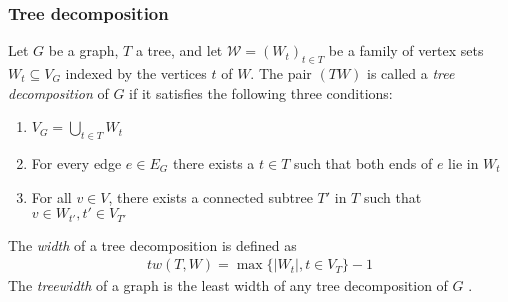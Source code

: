 \subsubsection{Tree decomposition}
Let $G$ be a graph, $T$ a tree, and let $\mathcal{W} = \left(W_t\right)_{t\in T}$ be a family of vertex sets $W_t \subseteq V_G$ indexed by the vertices $t$ of $W$. The pair $(TW)$ is called a \emph{tree decomposition} of $G$ if it satisfies the following three conditions:
\begin{enumerate}
	\item $V_G = \bigcup_{t\in T}W_t$
	\item For every edge $e\in E_G$ there exists a $t\in T$ such that both ends of $e$ lie in $W_t$
	\item For all $v\in V$, there exists a connected subtree $T'$ in $T$ such that $v \in W_{t'}, t' \in V_{T'}$
\end{enumerate}
\cite[P. 319]{Diestel_GraphTheory}
The \emph{width} of a tree decomposition is defined as 
\begin{align}
	tw(T,W) = \max\{ |W_t|,t\in V_T \} -1
\end{align}
The \emph{treewidth} of a graph is the least width of any tree decomposition of $G$ \cite[P. 321]{Diestel_GraphTheory}.

